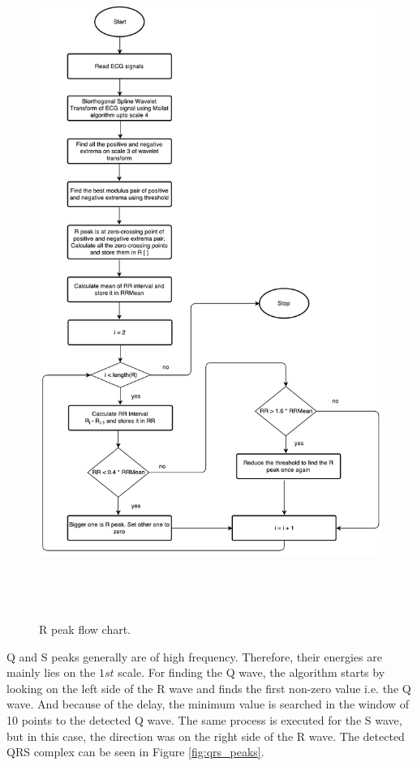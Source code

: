 \begin{figure}[htpb]
	\centering
	\includegraphics[width=25cm,height=22cm,keepaspectratio=true]{images/qrs.pdf}
	\caption{
		R peak flow chart.
	}
	\label{fig:r_peaks_flow_chart}
\end{figure}


Q and S peaks generally are of high frequency. Therefore, their energies are mainly lies on the $1{st}$ scale. For finding the Q wave, the algorithm starts by looking on the left side of the R wave and finds the first non-zero value i.e. the Q wave. And because of the delay, the minimum value is searched in the window of 10 points to the detected Q wave. The same process is executed for the S wave, but in this case, the direction was on the right side of the R wave. The detected QRS complex can be seen in Figure \ref{fig:qrs_peaks}.

